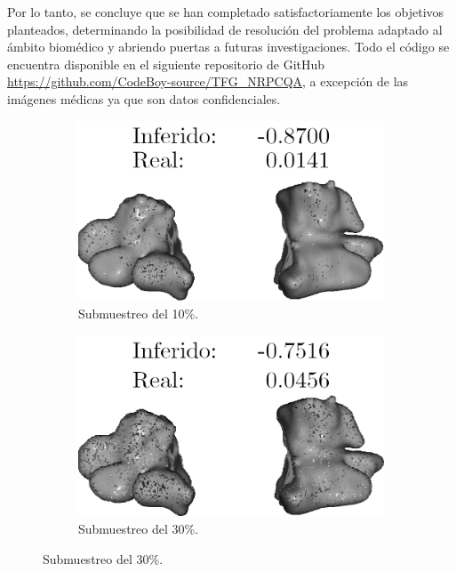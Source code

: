 Por lo tanto, se concluye que se han completado satisfactoriamente los objetivos 
planteados, determinando la posibilidad de resolución del problema adaptado 
al ámbito biomédico y abriendo puertas a futuras investigaciones. 
Todo el código se encuentra disponible en el siguiente repositorio de 
GitHub \url{https://github.com/CodeBoy-source/TFG_NRPCQA},
a excepción de las imágenes médicas ya que son datos confidenciales.

\begin{figure}
  \begin{subfigure}[b]{0.31\textwidth}
  \centering
    \includegraphics[width=\textwidth]{imagenes/chapter6/Maxiliar100014_7.png}
  \caption{Submuestreo del 10\%.}
\end{subfigure}\hspace{10pt}
  \begin{subfigure}[b]{0.31\textwidth}
  \centering
    \includegraphics[width=\textwidth]{imagenes/chapter6/Maxiliar100014_9.png}
  \caption{Submuestreo del 30\%.}
\end{subfigure}\hspace{10pt}

\end{figure}
